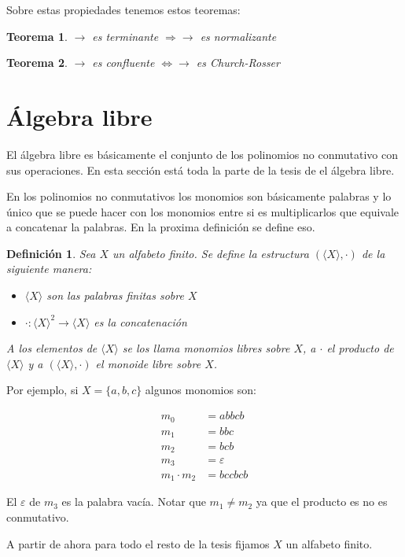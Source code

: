 \documentclass[12pt]{report}
\theoremstyle{customstyle}
\newtheorem{definition}{Definición}[chapter]
\newtheorem{theorem}{Teorema}[chapter]
\theoremstyle{factstyle}
\begin{document}
Sobre estas propiedades tenemos estos teoremas:

\begin{theorem}\label{thm:terminante ⇒ normalizante}
  $→$ es terminante $⇒ →$ es normalizante
\end{theorem}

\begin{theorem}\label{thm:confluente ⇔ Church-Rosser}
  $→$ es confluente $⇔ →$ es Church-Rosser
\end{theorem}

\section{Álgebra libre}

El álgebra libre es básicamente el conjunto de los polinomios no conmutativo con sus operaciones. En esta sección está toda la parte de la tesis de el álgebra libre.

En los polinomios no conmutativos los monomios son básicamente palabras y lo único que se puede hacer con los monomios entre si es multiplicarlos que equivale a concatenar la palabras. En la proxima definición se define eso.

\begin{definition}
  Sea $X$ un alfabeto finito. Se define la estructura $(⟨X⟩, ·)$ de la siguiente manera:
  \begin{itemize}
    \item $⟨X⟩$ son las palabras finitas sobre $X$
    \item $· : ⟨X⟩^2 → ⟨X⟩$ es la concatenación
  \end{itemize}
  A los elementos de $⟨X⟩$ se los llama monomios libres sobre $X$, a $·$ el producto de $⟨X⟩$ y a $(⟨X⟩, ·)$ el monoide libre sobre $X$.
\end{definition}

Por ejemplo, si $X = \{a, b, c\}$ algunos monomios son:

\begin{align*}
  m_0 &= abbcb \\
  m_1 &= bbc \\
  m_2 &= bcb \\
  m_3 &= ε \\
  m_1 · m_2 &= bccbcb
\end{align*}

El $ε$ de $m_3$ es la palabra vacía. Notar que $m_1 ≠ m_2$ ya que el producto es no es conmutativo.

A partir de ahora para todo el resto de la tesis fijamos $X$ un alfabeto finito.
\end{document}
